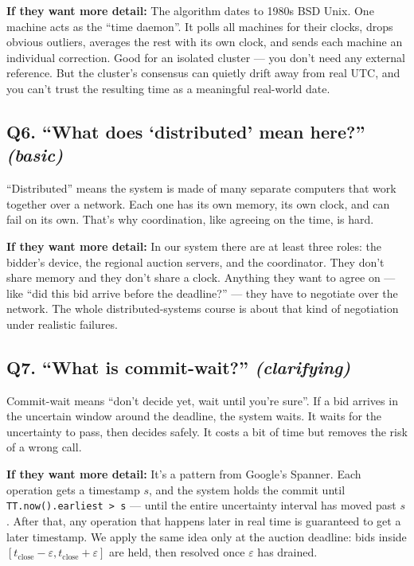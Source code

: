 \documentclass[a4paper,11pt]{article}
\begin{document}
\begin{deepans}
\textbf{If they want more detail:} The algorithm dates to 1980s
BSD Unix. One machine acts as the ``time daemon''. It polls all
machines for their clocks, drops obvious outliers, averages the
rest with its own clock, and sends each machine an individual
correction. Good for an isolated cluster --- you don't need any
external reference. But the cluster's consensus can quietly drift
away from real UTC, and you can't trust the resulting time as a
meaningful real-world date.
\end{deepans}

\subsection{Q6. ``What does `distributed' mean here?'' \textnormal{\small\itshape (basic)}}

\begin{shortans}
``Distributed'' means the system is made of many separate
computers that work together over a network. Each one has its own
memory, its own clock, and can fail on its own. That's why
coordination, like agreeing on the time, is hard.
\end{shortans}

\begin{deepans}
\textbf{If they want more detail:} In our system there are at
least three roles: the bidder's device, the regional auction
servers, and the coordinator. They don't share memory and they
don't share a clock. Anything they want to agree on --- like ``did
this bid arrive before the deadline?'' --- they have to negotiate
over the network. The whole distributed-systems course is about
that kind of negotiation under realistic failures.
\end{deepans}

\subsection{Q7. ``What is commit-wait?'' \textnormal{\small\itshape (clarifying)}}

\begin{shortans}
Commit-wait means ``don't decide yet, wait until you're sure''.
If a bid arrives in the uncertain window around the deadline, the
system waits. It waits for the uncertainty to pass, then decides
safely. It costs a bit of time but removes the risk of a wrong
call.
\end{shortans}

\begin{deepans}
\textbf{If they want more detail:} It's a pattern from Google's
Spanner. Each operation gets a timestamp $s$, and the system
holds the commit until \texttt{TT.now().earliest > s} --- until
the entire uncertainty interval has moved past $s$. After that,
any operation that happens later in real time is guaranteed to
get a later timestamp. We apply the same idea only at the auction
deadline: bids inside
$[t_\mathrm{close} - \varepsilon, t_\mathrm{close} + \varepsilon]$
are held, then resolved once $\varepsilon$ has drained.
\end{deepans}
\end{document}
